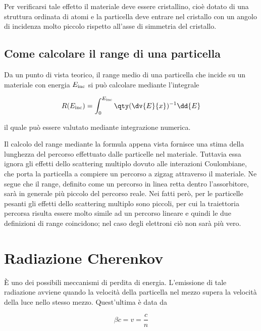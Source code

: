 \vspace{0.2cm}Per verificarsi tale effetto il materiale deve essere cristallino, cioè dotato di una struttura ordinata di atomi e la particella deve entrare nel cristallo con un angolo di incidenza molto piccolo rispetto all'asse di simmetria del cristallo.

\subsection{Come calcolare il range di una particella}

Da un punto di vista teorico, il range medio di una particella che incide su un materiale con energia $E_{\rm inc}$ si può calcolare mediante l'integrale

\begin{equation*}
    R(E_{\rm inc})=\int_{0}^{E_{\rm inc}} \qty( \dv{E}{x} )^{-1} \dd{E}
\end{equation*}

il quale può essere valutato mediante integrazione numerica.

\begin{approfondimento}
    \footnotesize
    Il calcolo del range mediante la formula appena vista fornisce una stima della lunghezza del percorso effettuato dalle particelle nel materiale. Tuttavia essa ignora gli effetti dello scattering multiplo dovuto alle interazioni Coulombiane, che porta la particella a compiere un percorso a zigzag attraverso il materiale. Ne segue che il range, definito come un percorso in linea retta dentro l'assorbitore, sarà in generale più piccolo del percorso reale. Nei fatti però, per le particelle pesanti gli effetti dello scattering multiplo sono piccoli, per cui la traiettoria percorsa risulta essere molto simile ad un percorso lineare e quindi le due definizioni di range coincidono; nel caso degli elettroni ciò non sarà più vero.
\end{approfondimento}

\section{Radiazione Cherenkov}

È uno dei possibili meccanismi di perdita di energia. L'emissione di tale radiazione avviene quando la velocità della particella nel mezzo supera la velocità della luce nello stesso mezzo. Quest'ultima è data da

\begin{equation*}
    \beta c=v=\frac{c}{n}
\end{equation*}

